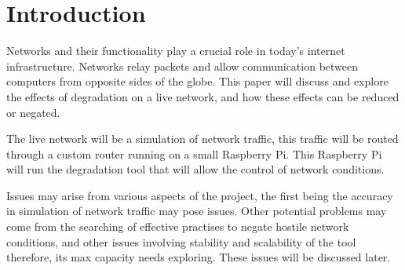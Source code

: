 \chapter{Introduction}
Networks and their functionality play a crucial role in today's internet infrastructure. Networks relay packets and allow communication between computers from opposite sides of the globe. This paper will discuss and explore the effects of degradation on a live network, and how these effects can be reduced or negated. 

The live network will be a simulation of network traffic, this traffic will be routed through a custom router running on a small Raspberry Pi. This Raspberry Pi will run the degradation tool that will allow the control of network conditions. 

Issues may arise from various aspects of the project, the first being the accuracy in simulation of network traffic may pose issues. Other potential problems may come from the searching of effective practises to negate hostile network conditions, and other issues involving stability and scalability of the tool therefore, its max capacity needs exploring. These issues will be discussed later.
